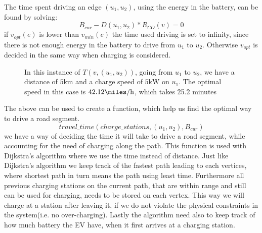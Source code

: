 The time spent driving an edge $(u_1, u_2)$, using the energy in the battery, can be found by solving:
\[B_{cur} - D(u_1, u_2) * R_{CO}(v) = 0\] 
if $v_{opt}(e)$ is lower than $v_{min}(e)$ the time used driving is set to infinity, since there is not enough energy in the battery to drive from $u_1$ to $u_2$. Otherwise $v_{opt}$ is decided in the same way when charging is considered.\\

\begin{figure}[!htb]
\label{fig:graph}
% 
\caption{In this instance of $T(v,(u_1, u_2))$, going from $u_1$ to $u_2$, we have a distance of $5 \si{\km}$ and a charge speed of $5 \si{\kW}$ on $u_1$. The optimal speed in this case is $42.12\si{\miles\per\hour}$, which takes 25.2 minutes}
\end{figure}


The above can be used to create a function, which help us find the optimal way to drive a road segment. 
\[travel\_time(charge\_stations, (u_1, u_2), B_{cur}) \]
we have a way of deciding the time it will take to drive a road segment, while accounting for the need of charging along the path. This function is used with Dijkstra's algorithm where we use the time instead of distance. Just like Dijkstra's algorithm we keep track of the fastest path leading to each vertices, where shortest path in turn means the path using least time. Furthermore all previous charging stations on the current path, that are within range and still can be used for charging, needs to be stored on each vertex. This way we will charge at a station after leaving it, if we do not violate the physical constraints in the system(i.e. no over-charging). Lastly the algorithm need also to keep track of how much battery the EV have, when it first arrives at a charging station.\\

